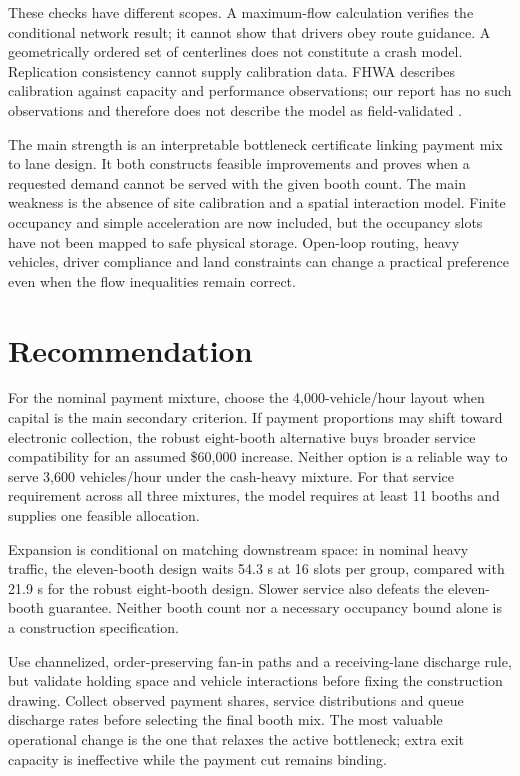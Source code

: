 \documentclass[12pt,letterpaper]{article}
\begin{document}
These checks have different scopes. A maximum-flow calculation verifies the conditional network result; it cannot show that drivers obey route guidance. A geometrically ordered set of centerlines does not constitute a crash model. Replication consistency cannot supply calibration data. FHWA describes calibration against capacity and performance observations; our report has no such observations and therefore does not describe the model as field-validated \cite{fhwa}.

The main strength is an interpretable bottleneck certificate linking payment mix to lane design. It both constructs feasible improvements and proves when a requested demand cannot be served with the given booth count. The main weakness is the absence of site calibration and a spatial interaction model. Finite occupancy and simple acceleration are now included, but the occupancy slots have not been mapped to safe physical storage. Open-loop routing, heavy vehicles, driver compliance and land constraints can change a practical preference even when the flow inequalities remain correct.

\section{Recommendation}
For the nominal payment mixture, choose the 4,000-vehicle/hour layout when capital is the main secondary criterion. If payment proportions may shift toward electronic collection, the robust eight-booth alternative buys broader service compatibility for an assumed \$60,000 increase. Neither option is a reliable way to serve 3,600 vehicles/hour under the cash-heavy mixture. For that service requirement across all three mixtures, the model requires at least 11 booths and supplies one feasible allocation.

Expansion is conditional on matching downstream space: in nominal heavy traffic, the eleven-booth design waits 54.3 s at 16 slots per group, compared with 21.9 s for the robust eight-booth design. Slower service also defeats the eleven-booth guarantee. Neither booth count nor a necessary occupancy bound alone is a construction specification.

Use channelized, order-preserving fan-in paths and a receiving-lane discharge rule, but validate holding space and vehicle interactions before fixing the construction drawing. Collect observed payment shares, service distributions and queue discharge rates before selecting the final booth mix. The most valuable operational change is the one that relaxes the active bottleneck; extra exit capacity is ineffective while the payment cut remains binding.
\end{document}
